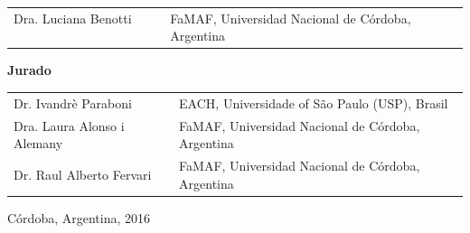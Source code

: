 \begin{center}
\begin{tabular}{ll}
Dra. Luciana Benotti $~~~~~~~~~~$ & FaMAF, Universidad Nacional de C\'ordoba, Argentina
\end{tabular}

\vspace{5mm}
\textbf{Jurado}

\vspace{5mm}

\begin{tabular}{ll}
Dr. Ivandr\`e Paraboni & EACH, Universidade of S\~ao Paulo (USP), Brasil \\
Dra. Laura Alonso i Alemany & FaMAF, Universidad Nacional de C\'ordoba, Argentina \\
Dr. Raul Alberto Fervari & FaMAF, Universidad Nacional de C\'ordoba, Argentina \\
\end{tabular}

\vspace{15mm}

\noindent C\'ordoba, Argentina, 2016
\end{center}
\newpage
\mbox{}
\thispagestyle{empty}
